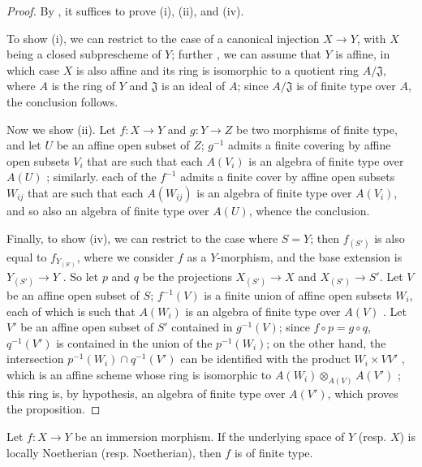 \begin{proof}
\label{proof-I.6.3.4}
By , it suffices to prove (i), (ii), and (iv).

To show (i), we can restrict to the case of a canonical injection $X\to Y$, with $X$ being a closed subprescheme of $Y$;
further , we can assume that $Y$ is affine, in which case $X$ is also affine  and its ring is isomorphic to a quotient ring $A/\mathfrak{J}$, where $A$ is the ring of $Y$ and $\mathfrak{J}$ is an ideal of $A$;
since $A/\mathfrak{J}$ is of finite type over $A$, the conclusion follows.

Now we show (ii).
Let $f:X\to Y$ and $g:Y\to Z$ be two morphisms of finite type, and let $U$ be an affine open subset of $Z$;
$g^{-1}$ admits a finite covering by affine open subsets $V_i$ that are such that each $A(V_i)$ is an algebra of finite type over $A(U)$ ;
similarly. each
of the $f^{-1}$ admits a finite cover by affine open subsets $W_{ij}$ that are such that each $A(W_{ij})$ is an algebra of finite type over $A(V_i)$, and so also an algebra of finite type over $A(U)$, whence the conclusion.

Finally, to show (iv), we can restrict to the case where $S=Y$;
then $f_{(S')}$ is also equal to $f_{Y_{(S')}}$, where we consider $f$ as a $Y$-morphism, and the base extension is $Y_{(S')}\to Y$ .
So let $p$ and $q$ be the projections $X_{(S')}\to X$ and $X_{(S')}\to S'$.
Let $V$ be an affine open subset of $S$;
$f^{-1}(V)$ is a finite union of affine open subsets $W_i$, each of which is such that $A(W_i)$ is an algebra of finite type over $A(V)$ .
Let $V'$ be an affine open subset of $S'$ contained in $g^{-1}(V)$;
since $f\circ p=g\circ q$, $q^{-1}(V')$ is contained in the union of the $p^{-1}(W_i)$;
on the other hand, the intersection $p^{-1}(W_i)\cap q^{-1}(V')$ can be identified with the product $W_i\times V V'$ , which is an affine scheme whose ring is isomorphic to $A(W_i)\otimes_{A(V)}A(V')$ ;
this ring is, by hypothesis, an algebra of finite type over $A(V')$, which proves the proposition.
\end{proof}

\begin{corollary}[6.3.5]
\label{I.6.3.5}
Let $f:X\to Y$ be an immersion morphism.
If the underlying space of $Y$ (resp. $X$) is locally Noetherian (resp. Noetherian), then $f$ is of finite type.
\end{corollary}

